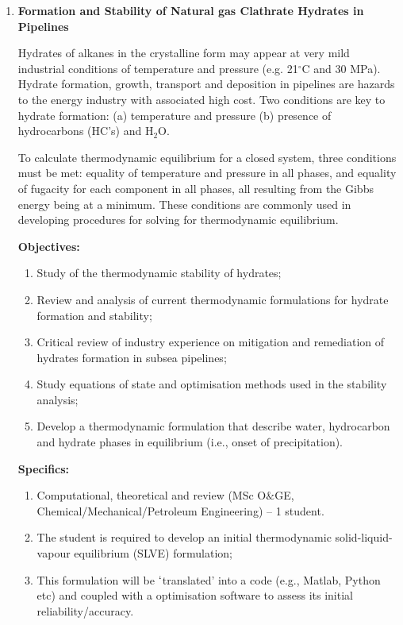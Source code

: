 \documentclass[12pts,a4paper,amsmath,amssymb,floatfix]{article}%
\newcommand{\all}{MSc O$\&$GE, Chemical/Mechanical/Petroleum Engineering}
\begin{document}
\begin{enumerate}[label=\bfseries Project: \arabic*:]
\clearpage

\item {\bf Formation and Stability of Natural gas Clathrate Hydrates in Pipelines}

Hydrates of alkanes in the crystalline form may appear at very mild industrial conditions of temperature and pressure (e.g. 21$^{\circ}$C and 30 MPa).  Hydrate formation, growth, transport and deposition in pipelines are hazards to the energy industry with associated high cost. Two conditions are key to hydrate formation: (a) temperature and pressure (b) presence of hydrocarbons (HC's) and H$_{2}$O.

To calculate thermodynamic equilibrium for a closed system, three conditions must be met: equality of temperature and pressure in all phases, and equality of fugacity for each component in all phases, all resulting from the Gibbs energy being at a minimum. These conditions are commonly used in developing procedures for solving for thermodynamic equilibrium. 

\noindent
{\bf Objectives:}
\begin{enumerate}
\item Study of the thermodynamic stability of hydrates; 
\item Review and analysis of current thermodynamic formulations for hydrate formation and stability;
\item Critical review of industry experience on mitigation and remediation of hydrates formation in subsea pipelines; 
\item Study equations of state and optimisation methods used in the stability analysis;
\item Develop a thermodynamic formulation that describe water, hydrocarbon and hydrate phases in equilibrium (i.e., onset of precipitation).
\end{enumerate} 
 

\noindent
{\bf Specifics:} 
\begin{enumerate}
\item Computational, theoretical and review (\all) -- 1 student. 
\item The student is required to develop an initial thermodynamic solid-liquid-vapour equilibrium (SLVE) formulation;
\item This formulation will be $\lq$translated' into a code (e.g., Matlab, Python etc) and coupled with a optimisation software to assess its initial reliability/accuracy.
\end{enumerate}


\end{enumerate}
\end{document}
